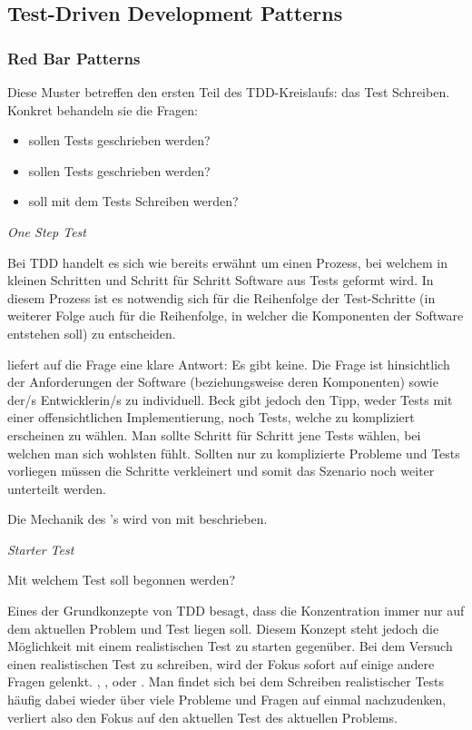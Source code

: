 \subsection{Test-Driven Development Patterns}
\subsubsection{Red Bar Patterns}

Diese Muster betreffen den ersten Teil des TDD-Kreislaufs: das Test Schreiben.
Konkret behandeln sie die Fragen:
\begin{itemize}
  \item {} sollen Tests geschrieben werden?
  \item {} sollen Tests geschrieben werden?
  \item {} soll mit dem Tests Schreiben  werden?
\end{itemize}

\textit{One Step Test}

Bei TDD handelt es sich wie bereits erwähnt um einen Prozess, bei welchem in kleinen Schritten und Schritt für Schritt Software aus Tests geformt wird. In diesem Prozess ist es notwendig sich für die Reihenfolge der Test-Schritte (in weiterer Folge auch für die Reihenfolge, in welcher die Komponenten der Software entstehen soll) zu entscheiden.

\cite[134]{Beck:2003} liefert auf die Frage  eine klare Antwort: Es gibt keine.
Die Frage ist hinsichtlich der Anforderungen der Software (beziehungsweise deren Komponenten) sowie der/s Entwicklerin/s zu individuell.
Beck gibt jedoch den Tipp, weder Tests mit einer offensichtlichen Implementierung, noch Tests, welche zu kompliziert erscheinen zu wählen.
Man sollte Schritt für Schritt jene Tests wählen, bei welchen man sich wohlsten fühlt.
Sollten nur zu komplizierte Probleme und Tests vorliegen müssen die Schritte verkleinert und somit das Szenario noch weiter unterteilt werden.

Die Mechanik des 's wird von \cite[134]{Beck:2003} mit  beschrieben.\newline\newline

\textit{Starter Test}

Mit welchem Test soll begonnen werden?

Eines der Grundkonzepte von TDD besagt, dass die Konzentration immer nur auf dem aktuellen Problem und Test liegen soll. Diesem Konzept steht jedoch die Möglichkeit mit einem realistischen Test zu starten gegenüber. Bei dem Versuch einen realistischen Test zu schreiben, wird der Fokus sofort auf einige andere Fragen gelenkt. , ,  oder . Man findet sich bei dem Schreiben realistischer Tests häufig dabei wieder über viele Probleme und Fragen auf einmal nachzudenken, verliert also den Fokus auf den aktuellen Test des aktuellen Problems.

